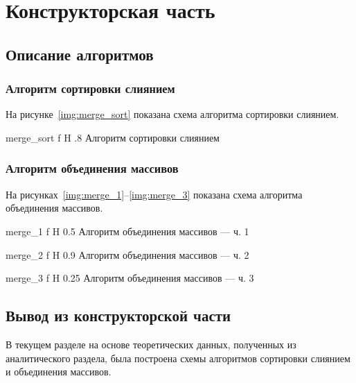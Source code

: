 \chapter{Конструкторская часть}

\section{Описание алгоритмов}

\subsection{Алгоритм сортировки слиянием}

На рисунке~\ref{img:merge_sort} показана схема алгоритма сортировки слиянием. 

    {merge_sort}
    {f}
    {H}
    {.8\textwidth}
    {Алгоритм сортировки слиянием}
    
\subsection{Алгоритм объединения массивов}

На рисунках~\ref{img:merge_1}--\ref{img:merge_3} показана схема алгоритма объединения массивов.

    {merge_1}
    {f}
    {H}
    {0.5\textwidth}
    {Алгоритм объединения массивов --- ч. 1}
        
    {merge_2}
    {f}
    {H}
    {0.9\textwidth}
    {Алгоритм объединения массивов --- ч. 2}
        
    {merge_3}
    {f}
    {H}
    {0.25\textwidth}
    {Алгоритм объединения массивов --- ч. 3}

\section*{Вывод из конструкторской части}

В текущем разделе на основе теоретических данных, полученных из аналитического раздела, была построена схемы алгоритмов сортировки слиянием и объединения массивов.
